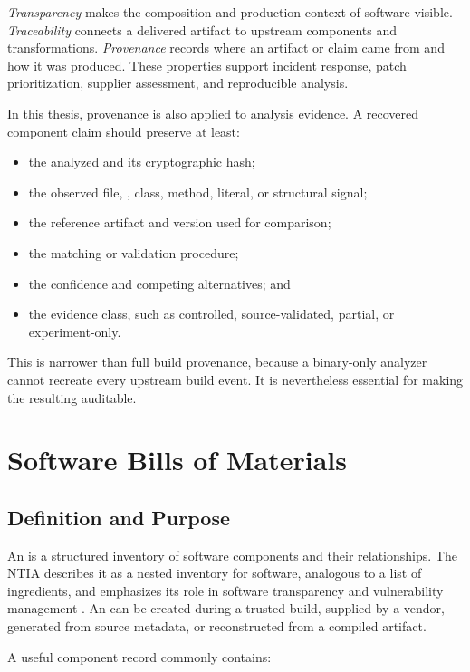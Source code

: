 \emph{Transparency} makes the composition and production context of software
visible. \emph{Traceability} connects a delivered artifact to upstream
components and transformations. \emph{Provenance} records where an artifact or
claim came from and how it was produced. These properties support incident
response, patch prioritization, supplier assessment, and reproducible
analysis.

In this thesis, provenance is also applied to analysis evidence. A recovered
component claim should preserve at least:

\begin{itemize}
  \item the analyzed \APK and its cryptographic hash;
  \item the observed file, \DEX, class, method, literal, or structural signal;
  \item the reference artifact and version used for comparison;
  \item the matching or validation procedure;
  \item the confidence and competing alternatives; and
  \item the evidence class, such as controlled, source-validated, partial, or
  experiment-only.
\end{itemize}

This is narrower than full build provenance, because a binary-only analyzer
cannot recreate every upstream build event. It is nevertheless essential for
making the resulting \SBOM auditable.

\section{Software Bills of Materials}

\subsection{Definition and Purpose}

An \SBOM is a structured inventory of software components and their
relationships. The NTIA describes it as a nested inventory for software,
analogous to a list of ingredients, and emphasizes its role in software
transparency and vulnerability management \cite{ntiaSbom}. An \SBOM can be
created during a trusted build, supplied by a vendor, generated from source
metadata, or reconstructed from a compiled artifact.

A useful component record commonly contains:

